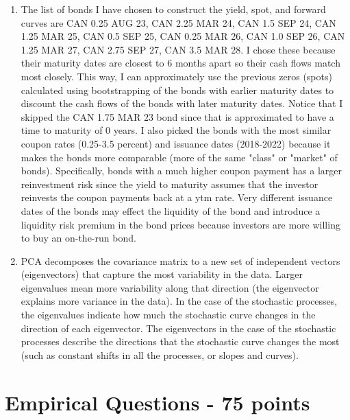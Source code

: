 \documentclass{article}
\begin{document}
\begin{enumerate}
    \item The list of bonds I have chosen to construct the yield, spot, and forward curves are CAN 0.25 AUG 23, CAN 2.25 MAR 24, CAN 1.5 SEP 24, CAN 1.25 MAR 25, CAN 0.5 SEP 25, CAN 0.25 MAR 26, CAN 1.0 SEP 26, CAN 1.25 MAR 27, CAN 2.75 SEP 27, CAN 3.5 MAR 28. I chose these because their maturity dates are closest to 6 months apart so their cash flows match most closely. This way, I can approximately use the previous zeros (spots) calculated using bootstrapping of the bonds with earlier maturity dates to discount the cash flows of the bonds with later maturity dates. Notice that I skipped the CAN 1.75 MAR 23 bond since that is approximated to have a time to maturity of 0 years. I also picked the bonds with the most similar coupon rates (0.25-3.5 percent) and issuance dates (2018-2022) because it makes the bonds more comparable (more of the same "class" or "market" of bonds). Specifically, bonds with a much higher coupon payment has a larger reinvestment risk since the yield to maturity assumes that the investor reinvests the coupon payments back at a ytm rate. Very different issuance dates of the bonds may effect the liquidity of the bond and introduce a liquidity risk premium in the bond prices because investors are more willing to buy an on-the-run bond.
    \item PCA decomposes the covariance matrix to a new set of independent vectors (eigenvectors) that capture the most variability in the data. Larger eigenvalues mean more variability along that direction (the eigenvector explains more variance in the data). In the case of the stochastic processes, the eigenvalues indicate how much the stochastic curve changes in the direction of each eigenvector. The eigenvectors in the case of the stochastic processes describe the directions that the stochastic curve changes the most (such as constant shifts in all the processes, or slopes and curves).
\end{enumerate}



\section*{Empirical Questions - 75 points} 
\end{document}
